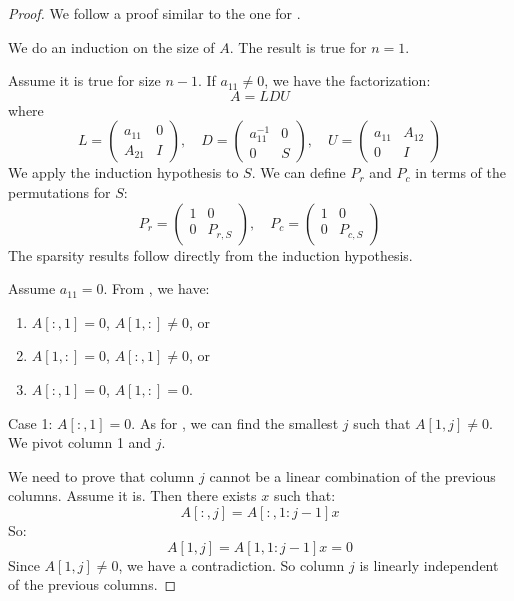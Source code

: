 \documentclass{article}
\begin{document}
\begin{proof}
    We follow a proof similar to the one for .

    We do an induction on the size of $A$. The result is true for $n=1$.

    Assume it is true for size $n-1$. If $a_{11} \neq 0$, we have the factorization:
    \[
        A = LDU
    \]
    where
    \[
        L = \begin{pmatrix}
            a_{11} & 0 \\
            A_{21} & I
        \end{pmatrix}, \quad
        D = \begin{pmatrix}
            a_{11}^{-1} & 0 \\
            0           & S
        \end{pmatrix}, \quad
        U = \begin{pmatrix}
            a_{11} & A_{12} \\
            0      & I
        \end{pmatrix}
    \]
    We apply the induction hypothesis to $S$. We can define $P_r$ and $P_c$ in terms of the permutations for $S$:
    \[ P_r = \begin{pmatrix}
            1 & 0       \\
            0 & P_{r,S}
        \end{pmatrix}, \quad
        P_c = \begin{pmatrix}
            1 & 0       \\
            0 & P_{c,S}
        \end{pmatrix}
    \]
    The sparsity results follow directly from the induction hypothesis.

    Assume $a_{11} = 0$. From , we have:
    \begin{enumerate}
        \item $A[:,1] = 0$, $A[1,:] \ne 0$, or
        \item $A[1,:] = 0$, $A[:,1] \ne 0$, or
        \item $A[:,1] = 0$, $A[1,:] = 0$.
    \end{enumerate}

    Case 1: $A[:,1] = 0$. As for , we can find the smallest $j$ such that $A[1,j] \neq 0$. We pivot column 1 and $j$.

    We need to prove that column $j$ cannot be a linear combination of the previous columns. Assume it is. Then there exists $x$ such that:
    \[ A[:,j] = A[:,1:j-1] x \]
    So:
    \[ A[1,j] = A[1,1:j-1] x = 0 \]
    Since $A[1,j] \neq 0$, we have a contradiction. So column $j$ is linearly independent of the previous columns.


\end{proof}
\end{document}
